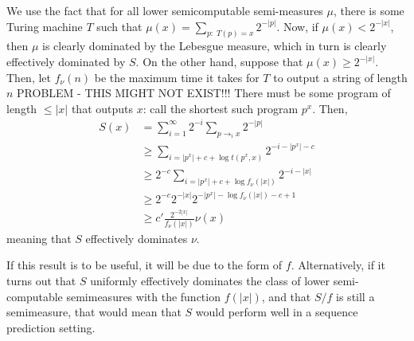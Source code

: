 \documentclass[12pt]{article}
\begin{document}
We use the fact that for all lower semicomputable semi-measures $\mu$, there is some Turing machine $T$ such that $\mu(x) = \sum_{p:\; T(p) = x}2^{-|p|}$. Now, if $\mu(x) < 2^{-|x|}$, then $\mu$ is clearly dominated by the Lebesgue measure, which in turn is clearly effectively dominated by $S$. On the other hand, suppose that $\mu(x) \geq 2^{-|x|}$. Then, let $f_\nu(n)$ be the maximum time it takes for $T$ to output a string of length $n$ PROBLEM - THIS MIGHT NOT EXIST!!! There must be some program of length $\leq |x|$ that outputs $x$: call the shortest such program $p^x$. Then,
\begin{align*}
  S(x) &= \sum_{i = 1}^\infty 2^{-i} \sum_{p \rightarrow_i x} 2^{-|p|} \\
  &\geq \sum_{i = |p^x| + c + \log t(p^x,x)} 2^{-i - |p^x| - c} \\
  &\geq 2^{-c}\sum_{i = |p^x| + c + \log f_\nu(|x|)} 2^{-i-|x|} \\
  &\geq 2^{-c} 2^{-|x|} 2^{-|p^x|-\log f_\nu(|x|) - c + 1} \\
  &\geq c' \frac{2^{-2|x|}}{f_\nu(|x|)} \nu(x)
\end{align*}
meaning that $S$ effectively dominates $\nu$.

If this result is to be useful, it will be due to the form of $f$. Alternatively, if it turns out that $S$ uniformly effectively dominates the class of lower semi-computable semimeasures with the function $f(|x|)$, and that $S/f$ is still a semimeasure, that would mean that $S$ would perform well in a sequence prediction setting.
\end{document}
